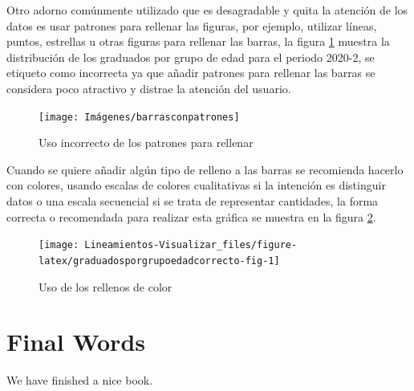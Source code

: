 \documentclass[
]{book}
\begin{document}
Otro adorno comúnmente utilizado que es desagradable y quita la atención de los datos es usar patrones para rellenar las figuras, por ejemplo, utilizar líneas, puntos, estrellas u otras figuras para rellenar las barras, la figura \ref{fig:barrasconpatrones-fig} muestra la distribución de los graduados por grupo de edad para el periodo 2020-2, se etiqueto como incorrecta ya que añadir patrones para rellenar las barras se considera poco atractivo y distrae la atención del usuario.

\begin{figure}

{\centering \texttt{[image: Imágenes/barrasconpatrones]} 

}

\caption{Uso incorrecto de los patrones para rellenar}\label{fig:barrasconpatrones-fig}
\end{figure}

Cuando se quiere añadir algún tipo de relleno a las barras se recomienda hacerlo con colores, usando escalas de colores cualitativas si la intención es distinguir datos o una escala secuencial si se trata de representar cantidades, la forma correcta o recomendada para realizar esta gráfica se muestra en la figura \ref{fig:graduadosporgrupoedadcorrecto-fig}.

\begin{figure}

{\centering \texttt{[image: Lineamientos-Visualizar\_files/figure-latex/graduadosporgrupoedadcorrecto-fig-1]} 

}

\caption{Uso de los rellenos de color}\label{fig:graduadosporgrupoedadcorrecto-fig}
\end{figure}

\hypertarget{final-words}{%
\chapter{Final Words}\label{final-words}}

We have finished a nice book.

  
\end{document}
